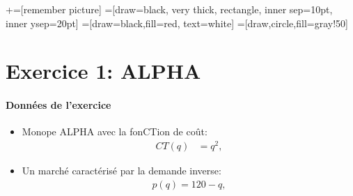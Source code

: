 


\usetikzlibrary{positioning}
\usetikzlibrary{snakes}
\usetikzlibrary{calc}
\usetikzlibrary{arrows}
\usetikzlibrary{decorations.markings}
\usetikzlibrary{shapes.misc}
\usetikzlibrary{matrix,shapes,arrows,fit,tikzmark}
\usetikzlibrary{matrix,chains,positioning,decorations.pathreplacing,arrows}
\usetikzlibrary{shapes}
\usetikzlibrary{shapes.geometric, arrows}
\newcommand\marktopleft[1]{
    \tikz[overlay,remember picture] 
        \node (marker-#1-a) at (-.3em,.3em) {};%
}
\newcommand\markbottomright[2]{%
    \tikz[overlay,remember picture] 
        \node (marker-#1-b) at (0em,0em) {};%
}
+=[remember picture] 
 =[draw=black, very thick, rectangle, inner sep=10pt, inner ysep=20pt]
 =[draw=black,fill=red, text=white]
=[draw,circle,fill=gray!50]

\begin{frame}
\titlepage
\end{frame}
\begin{frame}
 \tableofcontents
    \end{frame}

\section{Exercice 1: ALPHA }
\frame{\sectionpage}
\begin{frame}
[allowframebreaks]{\insertsection}
\framesubtitle{Données de l'exercice \\}
\begin{itemize}
    \item Monope ALPHA avec la fonCTion de coût:
    \begin{align}
    CT(q) &= q^2,
    \label{eq1}
    \end{align}
   \item Un marché caractérisé par la demande inverse:
   \begin{align}
     p(q)=120-q,
     \label{eq2}
   \end{align}
\end{itemize}
    \end{frame}

